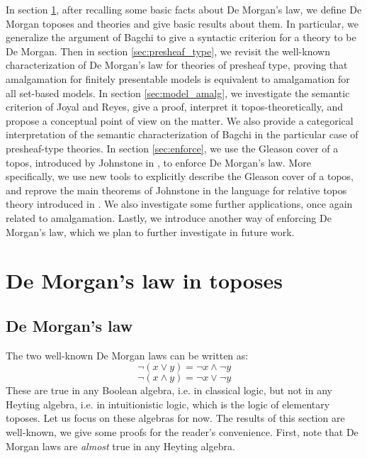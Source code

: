 \documentclass{article}
\begin{document}
In section \ref{sec:dml}, after recalling some basic facts about De Morgan's law, we define De Morgan toposes and theories and give basic results about them. In particular, we generalize the argument of Bagchi to give a syntactic criterion for a theory to be De Morgan. Then in section \ref{sec:presheaf_type}, we revisit the well-known characterization of De Morgan's law for theories of presheaf type, proving that amalgamation for finitely presentable models is equivalent to amalgamation for all set-based models. In section \ref{sec:model_amalg}, we investigate the semantic criterion of Joyal and Reyes, give a proof, interpret it topos-theoretically, and propose a conceptual point of view on the matter. We also provide a categorical interpretation of the semantic characterization of Bagchi in the particular case of presheaf-type theories. In section \ref{sec:enforce}, we use the Gleason cover of a topos, introduced by Johnstone in \cite{johnstone1980gleason}, to enforce De Morgan's law. More specifically, we use new tools to explicitly describe the Gleason cover of a topos, and reprove the main theorems of Johnstone in the language for relative topos theory introduced in \cite{caramello2021relative}. We also investigate some further applications, once again related to amalgamation. Lastly, we introduce another way of enforcing De Morgan's law, which we plan to further investigate in future work.

\section{De Morgan's law in toposes}\label{sec:dml}
\subsection{De Morgan's law}
The two well-known De Morgan laws can be written as:
$$\neg (x\lor y) = \neg x\land \neg y$$
$$\neg (x\land y) = \neg x\lor \neg y$$
These are true in any Boolean algebra, i.e. in classical logic, but not in any Heyting algebra, i.e. in intuitionistic logic, which is the logic of elementary toposes. Let us focus on these algebras for now. The results of this section are well-known, we give some proofs for the reader's convenience. First, note that De Morgan laws are \emph{almost} true in any Heyting algebra.
\end{document}

